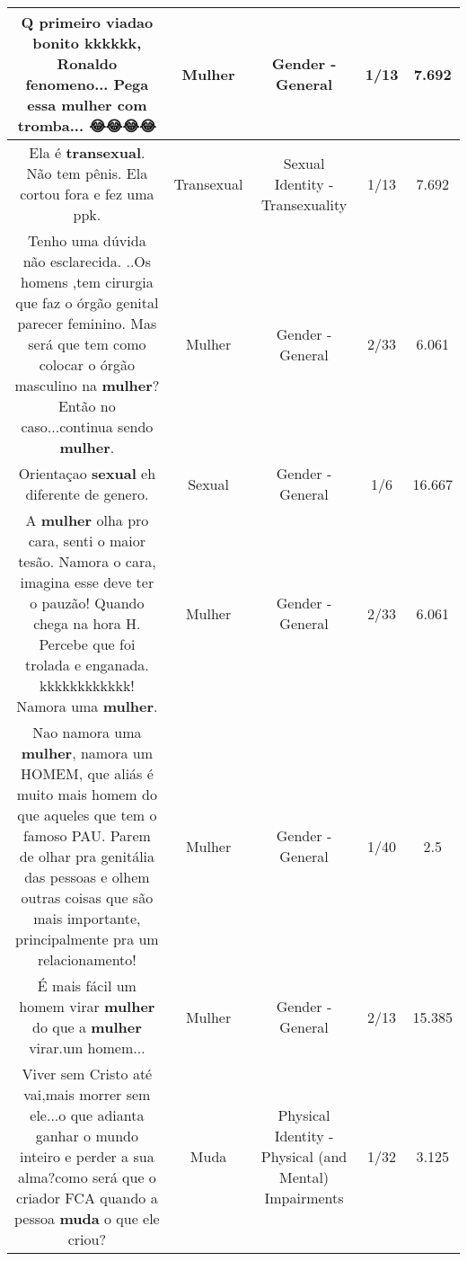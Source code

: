 \documentclass[11pt]{article}
\newlength\mylength
\begin{document}
\begin{center}
\begin{longtable}{|C{.65\mylength}|C{.30\mylength}|C{.12\mylength}|C{.12\mylength}|C{.12\mylength}|}
  \small Q primeiro viadao bonito kkkkkk,  Ronaldo fenomeno... Pega essa \textbf{mulher} com tromba... 😂😂😂😂\normalsize   & Mulher & Gender - General & 1/13 & 7.692 \\  \hline
  \small Ela é \textbf{transexual}. Não tem pênis. Ela cortou fora e fez uma ppk.\normalsize   & Transexual & Sexual Identity - Transexuality & 1/13 & 7.692 \\  \hline
  \small Tenho uma dúvida não esclarecida. ..Os homens ,tem cirurgia que faz o órgão genital parecer feminino. Mas será que tem como colocar o órgão masculino na \textbf{mulher}?Então no caso...continua sendo \textbf{mulher}.\normalsize   & Mulher & Gender - General & 2/33 & 6.061 \\  \hline
  \small Orientaçao \textbf{sexual} eh diferente de genero.\normalsize   & Sexual & Gender - General & 1/6 & 16.667 \\  \hline
  \small A \textbf{mulher} olha pro cara, senti o maior tesão. Namora o cara, imagina esse deve ter o pauzão! Quando chega na hora H. Percebe que foi trolada e enganada. kkkkkkkkkkkk! Namora uma \textbf{mulher}.\normalsize   & Mulher & Gender - General & 2/33 & 6.061 \\  \hline
  \small Nao namora uma \textbf{mulher}, namora um HOMEM, que aliás é muito mais homem do que aqueles que tem o famoso PAU.  Parem de olhar pra genitália das pessoas  e olhem outras coisas que são mais importante, principalmente pra um relacionamento!\normalsize   & Mulher & Gender - General & 1/40 & 2.5 \\  \hline
  \small É  mais fácil  um homem virar \textbf{mulher} do que a \textbf{mulher} virar.um homem...\normalsize   & Mulher & Gender - General & 2/13 & 15.385 \\  \hline
  \small Viver sem Cristo até vai,mais morrer sem ele...o que adianta ganhar o mundo inteiro e perder a sua alma?como será que o criador FCA quando a pessoa \textbf{muda} o que ele criou?\normalsize   & Muda & Physical Identity - Physical (and Mental) Impairments & 1/32 & 3.125 \\  \hline

\end{longtable}
\end{center}
\end{document}
